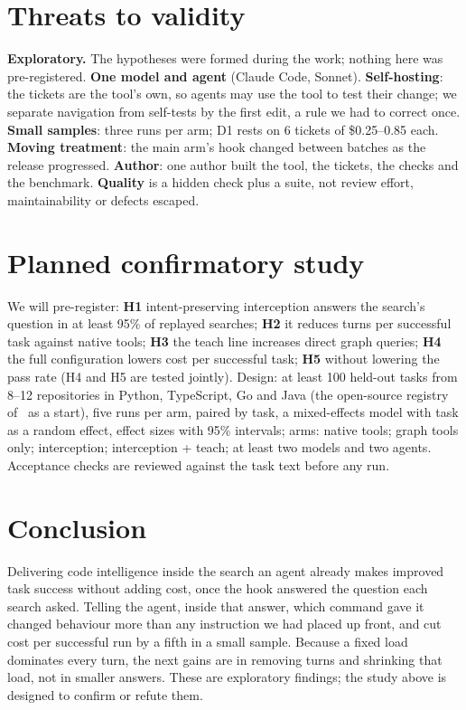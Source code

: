 \documentclass[conference]{IEEEtran}
\begin{document}
\section{Threats to validity}\label{sec:threats}
\textbf{Exploratory.} The hypotheses were formed during the work; nothing here was pre-registered. \textbf{One model
and agent} (Claude Code, Sonnet). \textbf{Self-hosting}: the tickets are the tool's own, so agents may use the tool to
test their change; we separate navigation from self-tests by the first edit, a rule we had to correct once.
\textbf{Small samples}: three runs per arm; D1 rests on 6 tickets of \$0.25--0.85 each. \textbf{Moving treatment}: the
main arm's hook changed between batches as the release progressed. \textbf{Author}: one author built the tool, the
tickets, the checks and the benchmark. \textbf{Quality} is a hidden check plus a suite, not review effort,
maintainability or defects escaped.

\section{Planned confirmatory study}\label{sec:plan}
We will pre-register: \textbf{H1} intent-preserving interception answers the search's question in at least 95\% of
replayed searches; \textbf{H2} it reduces turns per successful task against native tools; \textbf{H3} the teach line
increases direct graph queries; \textbf{H4} the full configuration lowers cost per successful task; \textbf{H5} without
lowering the pass rate (H4 and H5 are tested jointly). Design: at least 100 held-out tasks from 8--12 repositories in
Python, TypeScript, Go and Java (the open-source registry of~\cite{le2026precomputed} as a start), five runs per arm,
paired by task, a mixed-effects model with task as a random effect, effect sizes with 95\% intervals; arms: native
tools; graph tools only; interception; interception + teach; at least two models and two agents. Acceptance checks are
reviewed against the task text before any run.

\section{Conclusion}
Delivering code intelligence inside the search an agent already makes improved task success without adding cost, once
the hook answered the question each search asked. Telling the agent, inside that answer, which command gave it changed
behaviour more than any instruction we had placed up front, and cut cost per successful run by a fifth in a small
sample. Because a fixed load dominates every turn, the next gains are in removing turns and shrinking that load, not in
smaller answers. These are exploratory findings; the study above is designed to confirm or refute them.
\end{document}
